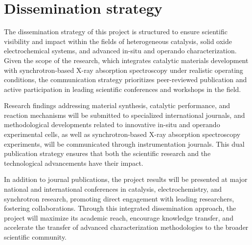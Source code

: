 \section{Dissemination strategy}

The dissemination strategy of this project is structured to ensure scientific visibility and impact within the fields of heterogeneous catalysis, solid oxide electrochemical systems, and advanced in-situ and operando characterization. Given the scope of the research, which integrates catalytic materials development with synchrotron-based X-ray absorption spectroscopy under realistic operating conditions, the communication strategy prioritizes peer-reviewed publication and active participation in leading scientific conferences and workshops in the field.

Research findings addressing material synthesis, catalytic performance, and reaction mechanisms will be submitted to specialized international journals, and methodological developments related to innovative in-situ and operando experimental cells, as well as synchrotron-based X-ray absorption spectroscopy experiments, will be communicated through instrumentation journals. This dual publication strategy ensures that both the scientific research and the technological advancements have their impact.

In addition to journal publications, the project results will be presented at major national and international conferences in catalysis, electrochemistry, and synchrotron research, promoting direct engagement with leading researchers, fostering collaborations. Through this integrated dissemination approach, the project will maximize its academic reach, encourage knowledge transfer, and accelerate the transfer of advanced characterization methodologies to the broader scientific community.